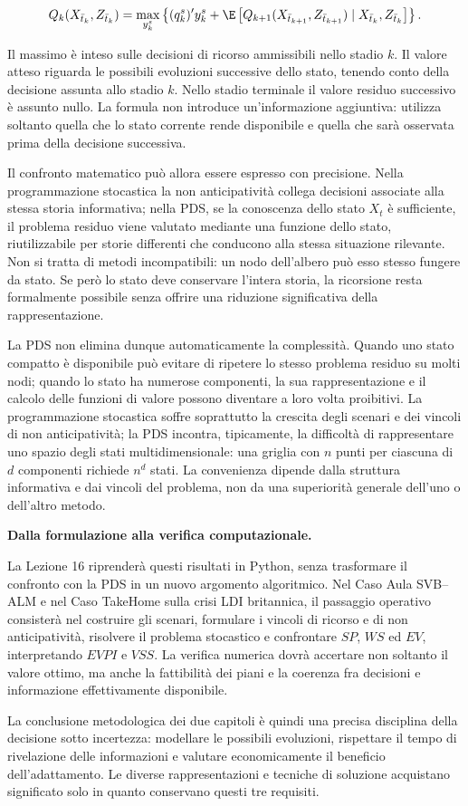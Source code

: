 \[
Q_k(X_{\bar t_k},Z_{\bar t_k})
=
\max_{y_k^s}
\left\{
(q_k^s)'y_k^s
+
\E\left[
Q_{k+1}(X_{\bar t_{k+1}},Z_{\bar t_{k+1}})
\mid X_{\bar t_k},Z_{\bar t_k}
\right]
\right\}.
\]

Il massimo \`e inteso sulle decisioni
di ricorso ammissibili nello stadio $k$.
Il valore atteso riguarda le possibili
evoluzioni successive dello stato,
tenendo conto della decisione assunta allo stadio $k$.
Nello stadio terminale il valore
residuo successivo \`e assunto nullo. La formula non introduce
un'informazione aggiuntiva: utilizza soltanto quella che lo
stato corrente rende disponibile e quella che sar\`a osservata
prima della decisione successiva.

Il confronto matematico pu\`o allora essere espresso con
precisione. Nella programmazione stocastica la non anticipativit\`a
collega decisioni associate alla stessa storia informativa;
nella PDS, se la conoscenza dello stato $X_t$ \`e sufficiente, il problema residuo
viene valutato mediante una funzione dello stato, riutilizzabile
per storie differenti che conducono alla stessa situazione
rilevante. Non si tratta di metodi incompatibili: un nodo
dell'albero pu\`o esso stesso fungere da stato. Se per\`o lo
stato deve conservare l'intera storia, la ricorsione resta
formalmente possibile senza offrire una riduzione significativa
della rappresentazione.

La PDS non elimina dunque automaticamente la complessit\`a.
Quando uno stato compatto \`e disponibile pu\`o evitare di
ripetere lo stesso problema residuo su molti nodi; quando lo
stato ha numerose componenti, la sua rappresentazione e il
calcolo delle funzioni di valore possono diventare a loro volta
proibitivi. La programmazione stocastica soffre soprattutto la
crescita degli scenari e dei vincoli di non anticipativit\`a;
la PDS incontra, tipicamente, la difficolt\`a di rappresentare
uno spazio degli stati multidimensionale: una griglia con $n$
punti per ciascuna di $d$ componenti richiede $n^d$ stati.
La convenienza dipende dalla struttura informativa e dai vincoli
del problema, non da una superiorit\`a generale dell'uno o
dell'altro metodo.

\medskip
\noindent
\textbf{Dalla formulazione alla verifica computazionale.}

La Lezione 16 riprender\`a questi risultati in Python, senza
trasformare il confronto con la PDS in un nuovo argomento
algoritmico. Nel Caso Aula SVB--ALM e nel Caso TakeHome sulla
crisi LDI britannica, il passaggio operativo consister\`a nel
costruire gli scenari, formulare i vincoli di ricorso e di
non anticipativit\`a, risolvere il problema stocastico e
confrontare $SP$, $WS$ ed $EV$, interpretando $EVPI$ e $VSS$.
La verifica numerica dovr\`a accertare non soltanto il valore
ottimo, ma anche la fattibilit\`a dei piani e la coerenza
fra decisioni e informazione effettivamente disponibile.

La conclusione metodologica dei due capitoli \`e quindi una
precisa disciplina della decisione sotto incertezza:
modellare le possibili evoluzioni, rispettare il tempo di
rivelazione delle informazioni e valutare economicamente il
beneficio dell'adattamento. Le diverse rappresentazioni e
tecniche di soluzione acquistano significato solo in quanto
conservano questi tre requisiti.